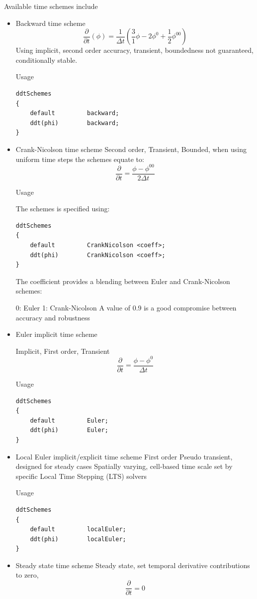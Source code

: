 \documentclass{article}
\begin{document}
Available time schemes include
\begin{itemize}
\item Backward time scheme
\begin{equation}
\frac{\partial}{\partial t}(\phi) = \frac{1}{\Delta t}(\frac{3}{1}\phi - 2\phi^0 + \frac{1}{2} \phi^{00})
\end{equation}
Using implicit, second order accuracy, transient, boundedness not guaranteed, conditionally stable. 

Usage 

\begin{verbatim}
ddtSchemes
{
    default         backward;
    ddt(phi)        backward;
}
\end{verbatim}

\item Crank-Nicolson time scheme
Second order, Transient, Bounded, when using uniform time steps the schemes equate to: 
\begin{equation}
\frac{\partial}{\partial t} = \frac{\phi - \phi^{00}}{2\Delta t}
\end{equation}

Usage

The schemes is specified using: 

\begin{verbatim}
ddtSchemes
{
    default         CrankNicolson <coeff>;
    ddt(phi)        CrankNicolson <coeff>;
}
\end{verbatim}

The coefficient provides a blending between Euler and Crank-Nicolson schemes:

0: Euler
1: Crank-Nicolson
A value of 0.9 is a good compromise between accuracy and robustness

\item Euler implicit time scheme

Implicit, First order, Transient 
\begin{equation}
\frac{\partial}{\partial t} = \frac{\phi - \phi^0}{\Delta t}
\end{equation}

Usage

\begin{verbatim}
ddtSchemes
{
    default         Euler;
    ddt(phi)        Euler;
}
\end{verbatim}


\item Local Euler implicit/explicit time scheme
First order
Pseudo transient, designed for steady cases
Spatially varying, cell-based time scale set by specific Local Time Stepping (LTS) solvers

Usage

\begin{verbatim}
ddtSchemes
{
    default         localEuler;
    ddt(phi)        localEuler;
}
\end{verbatim}

\item Steady state time scheme
Steady state, set temporal derivative contributions to zero, 
\begin{equation}
\frac{\partial}{\partial t} = 0
\end{equation}
\end{itemize}
\end{document}
